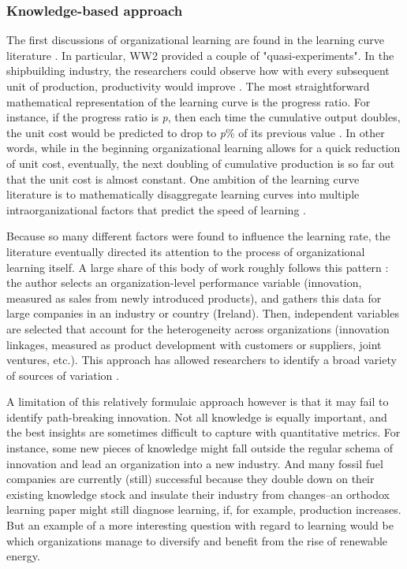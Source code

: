 \subsubsection{Knowledge-based approach}

The first discussions of organizational learning are found in the learning curve literature \citep{Wright1936}. In particular, WW2 provided a couple of "quasi-experiments". In the shipbuilding industry, the researchers could observe how with every subsequent unit of production, productivity would improve \citep{Searle1945}. The most straightforward mathematical representation of the learning curve is the progress ratio. For instance, if the progress ratio is \textit{p}, then each time the cumulative output doubles, the unit cost would be predicted to drop to \textit{p}\% of its previous value \citep[p. 15]{Argote2013-1}. In other words, while in the beginning organizational learning allows for a quick reduction of unit cost, eventually, the next doubling of cumulative production is so far out that the unit cost is almost constant. One ambition of the learning curve literature is to mathematically disaggregate learning curves into multiple intraorganizational factors that predict the speed of learning \citep[e.g.,][]{Arrow1962}.

Because so many different factors were found to influence the learning rate, the literature eventually directed its attention to the process of organizational learning itself. A large share of this body of work roughly follows this pattern \citep[taken from][]{Love2014}: the author selects an organization-level performance variable (innovation, measured as sales from newly introduced products), and gathers this data for large companies in an industry or country (Ireland). Then, independent variables are selected that account for the heterogeneity across organizations (innovation linkages, measured as product development with customers or suppliers, joint ventures, etc.). This approach has allowed researchers to identify a broad variety of sources of variation \citep[pp. 18ff]{Argote2013-1}.

A limitation of this relatively formulaic approach however is that it may fail to identify path-breaking innovation. Not all knowledge is equally important, and the best insights are sometimes difficult to capture with quantitative metrics. For instance, some new pieces of knowledge might fall outside the regular schema of innovation and lead an organization into a new industry. And many fossil fuel companies are currently (still) successful because they double down on their existing knowledge stock and insulate their industry from changes--an orthodox learning paper might still diagnose learning, if, for example, production increases. But an example of a more interesting question with regard to learning would be which organizations manage to diversify and benefit from the rise of renewable energy.

